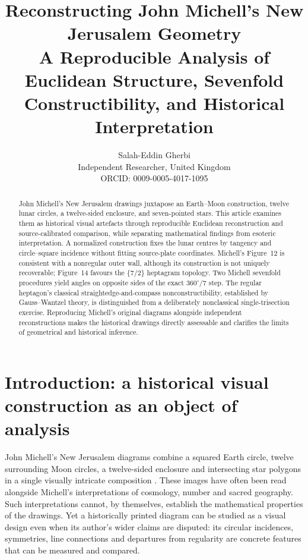\documentclass[11pt]{article}
\title{\textbf{Reconstructing John Michell's New Jerusalem Geometry}\\
\large A Reproducible Analysis of Euclidean Structure, Sevenfold Constructibility,
and Historical Interpretation}
\author{
Salah-Eddin Gherbi\\
Independent Researcher, United Kingdom\\
ORCID\@: \mbox{0009\mbox{-}0005\mbox{-}4017\mbox{-}1095}
}
\date{}
\begin{document}
\maketitle

\begin{abstract}
John Michell's New Jerusalem drawings juxtapose an Earth--Moon construction,
twelve lunar circles, a twelve-sided enclosure, and seven-pointed stars.
This article examines them as historical visual artefacts through reproducible
Euclidean reconstruction and source-calibrated comparison, while separating
mathematical findings from esoteric interpretation.  A normalized construction
fixes the lunar centres by tangency and circle--square incidence without
fitting source-plate coordinates.  Michell's Figure~12 is consistent with a
nonregular outer wall, although its construction is not uniquely recoverable;
Figure~14 favours the $\{7/2\}$ heptagram topology.  Two Michell sevenfold
procedures yield angles on opposite sides of the exact $360^\circ/7$ step.
The regular heptagon's classical straightedge-and-compass nonconstructibility,
established by Gauss--Wantzel theory, is distinguished from a deliberately
nonclassical single-trisection exercise.  Reproducing Michell's original
diagrams alongside independent reconstructions makes the historical drawings
directly assessable and clarifies the limits of geometrical and historical
inference.
\end{abstract}

\section{Introduction: a historical visual construction as an object of analysis}
John Michell's New Jerusalem diagrams combine a squared Earth circle, twelve surrounding Moon circles, a twelve-sided enclosure and intersecting star polygons in a single visually intricate composition \citep{michell1973city}. These images have often been read alongside Michell's interpretations of cosmology, number and sacred geography. Such interpretations cannot, by themselves, establish the mathematical properties of the drawings. Yet a historically printed diagram can be studied as a visual design even when its author's wider claims are disputed: its circular incidences, symmetries, line connections and departures from regularity are concrete features that can be measured and compared.
\end{document}
